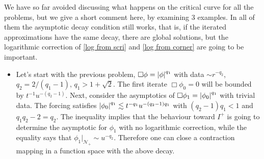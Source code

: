\documentclass[11pt, oneside]{amsart}
\begin{document}
	We have so far avoided discussing what happens on the critical curve for all the problems, but we give a short comment here, by examining 3 examples. In all of them the asymptotic decay condition still works, that is, if the iterated approximations have the same decay, there are global solutions, but the logarithmic correction of \cref{log from scri} and \cref{log from corner} are going to be important.
	\begin{itemize}
		\item  Let's start with the previous problem, $\Box\phi=\left\lvert \phi\right\rvert^{q_1}$ with data $\sim r^{-q_2}$, $q_2=2/(q_1-1),\, q_1>1+\sqrt{2}$. The first iterate $\Box\phi_0=0$ will be bounded by $t^{-1}u^{-(q_2-1)}$. Next, consider the asymptotics of $\Box\phi_1=\left\lvert \phi_0\right\rvert^{q_1}$ with trivial data. The forcing satisfies $\left\lvert \phi_0\right\rvert^{q_1}\lesssim t^{-q_1}u^{-(q_2-1)q_1}$ with $(q_2-1)q_1<1$ and $q_1q_2-2=q_2$. The inequality implies that the behaviour toward $I^+$ is going to determine the asymptotic for $\phi_1$ with no logarithmic correction, while the equality says that $\phi_1|_{\mathcal{N}_+}\sim u^{-q_2}$. Therefore one can close a contraction mapping in a function space with the above decay.
		

\end{itemize}
\end{document}
